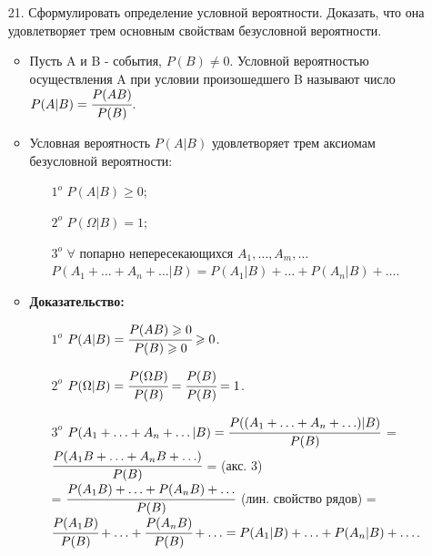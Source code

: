 \documentclass[a4paper]{article}
\begin{document}
\begin{enumerate}
\item[21.] Сформулировать определение условной вероятности. Доказать, что она удовлетворяет трем основным свойствам безусловной вероятности. \\
\begin{itemize}
\item Пусть A и B - события, $P(B) \neq 0$. Условной вероятностью осуществления A при условии произошедшего B называют число $P(A|B) = \cfrac{P(AB)}{P(B)}$.
\item Условная вероятность $P(A|B)$ удовлетворяет трем аксиомам безусловной вероятности: 
	\begin{enumerate}
	\item[$1^o$] $P(A|B) \geqslant 0$;
	\item[$2^o$] $P(\Omega|B) = 1$;
	\item[$3^o$] $\forall$ попарно непересекающихся $A_1, \ldots, A_m, \ldots$ $P(A_1 + \ldots + A_n + \ldots |B) = P(A_1|B) + \ldots + P(A_n|B) + \ldots$.
	\end{enumerate}
\item \textbf{Доказательство:} 
	\begin{enumerate}
	\item[$1^o$] $P(A|B) = \cfrac{P(AB) \geqslant 0}{P(B) \geqslant 0} \geqslant 0$.
	\item[$2^o$] $P(\Omega|B) = \cfrac{P(\Omega B)}{P(B)} = \cfrac{P(B)}{P(B)} = 1$.
	\item[$3^o$] $P(A_1 + \ldots + A_n + \ldots |B) = \cfrac{P((A_1 + \ldots + A_n + \ldots)|B)}{P(B)}$ = $\cfrac{P(A_1B + \ldots + A_nB + \ldots)}{P(B)}$ = (акс. 3) \\ = $\cfrac{P(A_1B) + \ldots + P(A_nB) + \ldots}{P(B)}$ (лин. свойство рядов) = $\cfrac{P(A_1B)}{P(B)} + \ldots + \cfrac{P(A_nB)}{P(B)} + \ldots = P(A_1|B) + \ldots + P(A_n|B) + \ldots$.
	\end{enumerate}
\end{itemize}




\end{enumerate}
\end{document}
